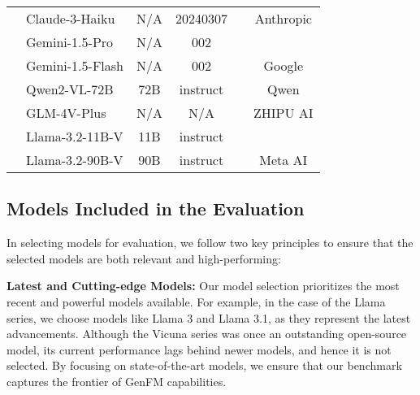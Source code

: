 \begin{table}[t]
{\begin{tabular}{c l c c c c}
& \cellcolor{modelcolor2} Claude-3-Haiku & N/A & 20240307 & \cellcolor{commercialcolor}\xmarkcolor & \multirow{-2}{*}{Anthropic} \\
\cmidrule{2-6}
& \cellcolor{modelcolor2} Gemini-1.5-Pro & N/A & 002 & \cellcolor{commercialcolor}\xmarkcolor &  \\
& \cellcolor{modelcolor2} Gemini-1.5-Flash & N/A & 002 & \cellcolor{commercialcolor}\xmarkcolor &  \multirow{-2}{*}{Google}\\
\cmidrule{2-6}
& \cellcolor{modelcolor2} Qwen2-VL-72B &  72B
& instruct & \cellcolor{opensourcecolor}\checkmarkcolor& Qwen \\
\cmidrule{2-6}
& \cellcolor{modelcolor2} GLM-4V-Plus & N/A & N/A & \cellcolor{commercialcolor}\xmarkcolor & ZHIPU AI \\
\cmidrule{2-6}
& \cellcolor{modelcolor2} Llama-3.2-11B-V & 11B & instruct & \cellcolor{opensourcecolor}\checkmarkcolor &  \\
& \cellcolor{modelcolor2} Llama-3.2-90B-V & 90B & instruct & \cellcolor{opensourcecolor}\checkmarkcolor & \multirow{-2}{*}{Meta AI} \\
\bottomrule[1pt]
\end{tabular}}
\label{tab:model_list}
\vspace{-15pt}
\end{table}

\subsection{Models Included in the Evaluation}

In selecting models for evaluation, we follow two key principles to ensure that the selected models  are both relevant and high-performing:

\textbf{Latest and Cutting-edge Models:} Our model selection prioritizes the most recent and powerful models available. For example, in the case of the Llama series, we choose models like Llama 3 and Llama 3.1, as they represent the latest advancements. Although the Vicuna series \cite{vicuna} was once an outstanding open-source model, its current performance lags behind newer models, and hence it is not selected. By focusing on state-of-the-art models, we ensure that our benchmark captures the frontier of GenFM capabilities.

